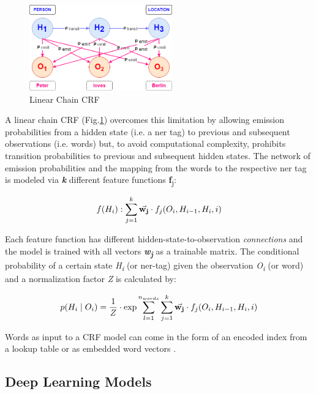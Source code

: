 \begin{figure}[H]   %
    \centering
    \includegraphics[width=0.55\textwidth]{Assets/CRF}
    \caption{Linear Chain \gls{CRF}}
    \label{fig:CRF}
\end{figure}
A linear chain \gls{CRF} (Fig.\ref{fig:CRF}) overcomes this limitation by allowing emission probabilities from a hidden state (i.e. a \gls{ner} tag) to previous and subsequent observations (i.e. words) but, to avoid computational complexity, prohibits transition probabilities to previous and subsequent hidden states.
The network of emission probabilities and the mapping from the words to the respective \gls{ner} tag is modeled via \textit{\textbf{k}} different feature functions \textbf{f}\textsubscript{j}:

\begin{equation}
f(H_i): \sum\limits_{j=1}^{k} \vec{\textbf{w\textsubscript{j}}} \cdot f_j(O_i, H_{i-1}, H_i, i)  \label{eq:crf1}
\end{equation}

Each feature function has different hidden-state-to-observation \textit{connections} and the model is trained with all vectors \textit{\textbf{w\textsubscript{j}}} as a trainable matrix.
The conditional probability of a certain state \textit{H\textsubscript{i}} (or \gls{ner}-tag) given the observation \textit{O\textsubscript{i}} (or word) and a normalization factor \textit{Z} is calculated by:

\begin{equation}
p(H_i \;| \;O_i) = \frac{1}{Z} \cdot \exp \sum\limits_{l=1}^{n_{words}} \sum\limits_{j=1}^{k} \vec{\textbf{w\textsubscript{j}}} \cdot f_j(O_i, H_{i-1}, H_i, i)  \label{eq:crf2}
\end{equation}

Words as input to a \gls{CRF} model can come in the form of an encoded index from a lookup table or as embedded word vectors \cite{StanfordNLPNER}.

\subsection{Deep Learning Models}\label{subsec:deep-learning-models}

